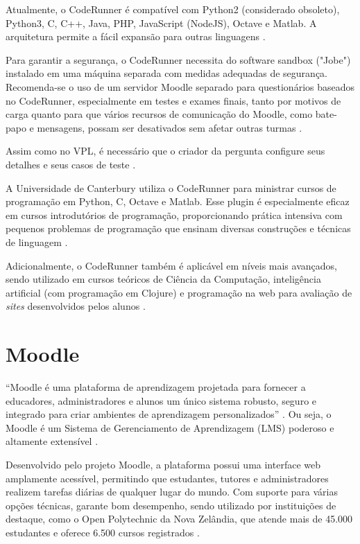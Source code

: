 Atualmente, o CodeRunner é compatível com Python2 (considerado obsoleto), Python3, C, C++, Java, PHP, JavaScript (NodeJS), Octave e Matlab. A arquitetura permite a fácil expansão para outras linguagens \cite{moodle}.

Para garantir a segurança, o CodeRunner necessita do software sandbox ("Jobe") instalado em uma máquina separada com medidas adequadas de segurança. Recomenda-se o uso de um servidor Moodle separado para questionários baseados no CodeRunner, especialmente em testes e exames finais, tanto por motivos de carga quanto para que vários recursos de comunicação do Moodle, como bate-papo e mensagens, possam ser desativados sem afetar outras turmas \cite{coderunner}.

Assim como no VPL, é necessário que o criador da pergunta configure seus detalhes e seus casos de teste \cite{coderunner}.

A Universidade de Canterbury utiliza o CodeRunner para ministrar cursos de programação em Python, C, Octave e Matlab. Esse plugin é especialmente eficaz em cursos introdutórios de programação, proporcionando prática intensiva com pequenos problemas de programação que ensinam diversas construções e técnicas de linguagem \cite[p.~48]{lobbharlow}. 

Adicionalmente, o CodeRunner também é aplicável em níveis mais avançados, sendo utilizado em cursos teóricos de Ciência da Computação, inteligência artificial (com programação em Clojure) e programação na web para avaliação de \textit{sites} desenvolvidos pelos alunos \cite[p.~48]{lobbharlow}.

\section{Moodle}

“Moodle é uma plataforma de aprendizagem projetada para fornecer a educadores, administradores e alunos um único sistema robusto, seguro e integrado para criar ambientes de aprendizagem personalizados” \cite{moodle}. Ou seja, o Moodle é um Sistema de Gerenciamento de Aprendizagem (LMS) poderoso e altamente extensível \cite{moodle}. 

Desenvolvido pelo projeto Moodle, a plataforma possui uma interface web amplamente acessível, permitindo que estudantes, tutores e administradores realizem tarefas diárias de qualquer lugar do mundo. Com suporte para várias opções técnicas, garante bom desempenho, sendo utilizado por instituições de destaque, como o Open Polytechnic da Nova Zelândia, que atende mais de 45.000 estudantes e oferece 6.500 cursos registrados \cite{moodle}. 

